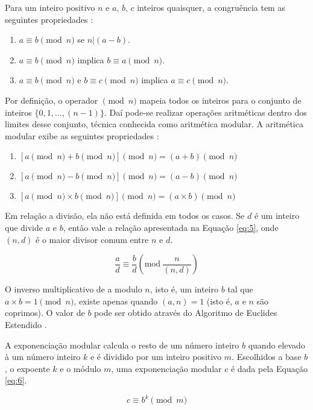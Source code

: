 Para um inteiro positivo \(n\) e \(a\), \(b\), \(c\) inteiros quaisquer, a congruência tem as seguintes propriedades \cite{Stallings:2011}:
\begin{enumerate}
  \item $a \equiv b \pmod n$ se $n|(a - b)$.
  \item $a \equiv b \pmod n$ implica $b \equiv a \pmod n$.
  \item $a \equiv b \pmod n$ e $b \equiv c \pmod n$ implica $a \equiv c \pmod n$.
\end{enumerate}

Por definição, o operador $\pmod n$ mapeia todos os inteiros para o conjunto de inteiros $\{0, 1, ..., (n-1)\}$. Daí pode-se realizar operações aritméticas dentro dos limites desse conjunto, técnica conhecida como aritmética modular. A aritmética modular exibe as seguintes propriedades \cite{Stallings:2011}:
\begin{enumerate}
  \item $[a \pmod n + b \pmod n] \pmod n = (a + b) \pmod n$
  \item $[a \pmod n - b \pmod n] \pmod n = (a - b) \pmod n$
  \item $[a \pmod n \times b \pmod n] \pmod n = (a \times b) \pmod n$
\end{enumerate}

Em relação a divisão, ela não está definida em todos os casos. Se \(d\) é um inteiro que divide \(a\) e \(b\), então vale a relação apresentada na Equação \ref{eq:5}, onde \((n, d)\) é o maior divisor comum entre \(n\) e \(d\).

\begin{equation}
  \frac{a}{d} \equiv \frac{b}{d}\left(\mbox{mod}\ \frac{n}{(n,d)}\right) \label{eq:5}
\end{equation}

O inverso multiplicativo de a modulo \(n\), isto é, um inteiro \(b\) tal que \(a \times b = 1 \pmod  n\), existe apenas quando \((a, n) = 1\) (isto é, \(a\) e \(n\) são coprimos). O valor de \(b\) pode ser obtido através do Algoritmo de Euclides Estendido \cite{Halim:2013}.
\par A exponenciação modular calcula o resto de um número inteiro \(b\) quando elevado à um número inteiro \(k\) e é dividido por um inteiro positivo \(m\). Escolhidos a base \(b\), o expoente \(k\) e o módulo \(m\), uma exponenciação modular \(c\) é dada pela Equação \ref{eq:6}.

\begin{equation}
  c \equiv b^k\pmod m \label{eq:6}
\end{equation}

